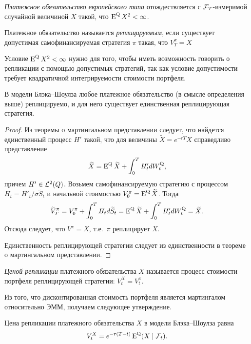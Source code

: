 \begin{definition}
\emph{Платежное обязательство европейского типа} отождествляется с $\mathcal{F}_T$-измеримой случайной величиной $X$ такой, что $\operatorname{E}^{\mathrm{Q}} X^2 < \infty$.

Платежное обязательство называется \emph{реплицируемым}, если существует допустимая самофинансируемая стратегия $\pi$ такая, что $V_T^\pi = X$ \as
\end{definition}

\begin{remark}
Условие $\operatorname{E}^{\mathrm{Q}} X^2 <\infty$ нужно для того, чтобы иметь возможность говорить о репликации с помощью допустимых стратегий, так как условие допустимости требует квадратичной интегрируемости стоимости портфеля.
\end{remark}

\begin{theorem}
В модели Блэка--Шоулза любое платежное обязательство (в смысле определения выше) реплицируемо, и для него существует единственная реплицирующая стратегия.
\end{theorem}

\begin{proof}
Из теоремы о мартингальном представлении следует, что найдется единственный процесс $H'$ такой, что для величины $\tilde X = e^{-rT} X$ справедливо представление
\[
\widetilde X = \operatorname{E}^{\mathrm{Q}} \widetilde X + \int_0^T H'_t d W_t^{\mathrm{Q}},
\]
причем $H'\in\mathcal{L}^2(Q)$. Возьмем самофинансируемую стратегию с процессом $H_t = H'_t/\sigma \tilde S_t$ и начальной стоимостью $V_0^\pi = \operatorname{E}^{\mathrm{Q}} \widetilde X$. Тогда 
\[
\widetilde V_T^\pi = V_0^\pi + \int_0^T H_t d\widetilde S_t = \operatorname{E}^{\mathrm{Q}} \widetilde X + \int_0^T H'_t d W_t^{\mathrm{Q}} = \widetilde X.
\]
Отсюда следует, что $V^\pi = X$, т.е.\ $\pi$ реплицирует $X$.

Единственность реплицирующей стратегии следует из единственности в теореме о мартингальном представлении.
\end{proof}

\begin{definition}
\emph{Ценой репликации} платежного обязательства $X$ называется процесс стоимости портфеля реплицирующей стратегии: $V_t^X = V_t^\pi$.
\end{definition}

Из того, что дисконтированная стоимость портфеля является мартингалом относительно ЭММ, получаем следующее утверждение.

\begin{theorem}
Цена репликации платежного обязательства $X$ в модели Блэка--Шоулза равна
\begin{equation}
V_t^X = e^{-r(T-t)} \operatorname{E}^{\mathrm{Q}} (X \mid \mathcal{F}_t).
\end{equation}
\end{theorem}

